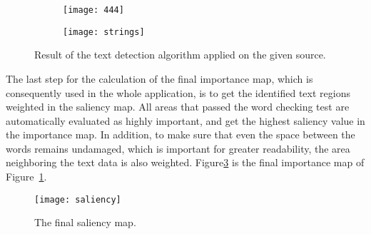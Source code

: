 \documentclass[draft,final]{vutinfth} %
\begin{document}
	\begin{figure}
		\centering
		\begin{subfigure}[b]{0.45\columnwidth}
			\centering
			\texttt{[image: 444]}
			\label{fig:strings:org}
		\end{subfigure}
		\begin{subfigure}[b]{0.45\columnwidth}
			\centering
			\texttt{[image: strings]}
		\end{subfigure}
		\caption{Result of the text detection algorithm applied on the given source.}
		\label{fig:strings} %
	\end{figure}
	The last step for the calculation of the final importance map, which is consequently used in the whole application, is to get the identified text regions weighted in the saliency map. 
	All areas that passed the word checking test are automatically evaluated as highly important, and get the highest saliency value in the importance map.
	In addition, to make sure that even the space between the words remains undamaged, which is important for greater readability, the area neighboring the text data is also weighted.
	Figure\ref{fig:saliency} is the final importance map of Figure~\ref{fig:strings:org}.
	\begin{figure}[h]
		\centering		
		\texttt{[image: saliency]}
		\caption{The final saliency map.}
		\label{fig:saliency}
	\end{figure}
	
\end{document}
